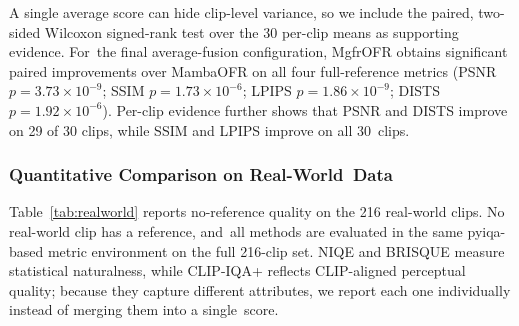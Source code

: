 \documentclass[symmetry,article,accept,pdftex,moreauthors]{Definitions/mdpi}
\begin{document}
A single average score can hide clip-level variance, so we include the paired, two-sided Wilcoxon signed-rank test over the 30 per-clip means as supporting evidence. For~the final average-fusion configuration, MgfrOFR obtains significant paired improvements over MambaOFR on all four full-reference metrics (PSNR $p=3.73\times10^{-9}$; SSIM $p=1.73\times10^{-6}$; LPIPS $p=1.86\times10^{-9}$; DISTS $p=1.92\times10^{-6}$). Per-clip evidence further shows that PSNR and DISTS improve on 29 of 30 clips, while SSIM and LPIPS improve on all 30~clips.

\subsubsection{Quantitative Comparison on Real-World~Data}

Table~\ref{tab:realworld} reports no-reference quality on the 216 real-world clips. No real-world clip has a reference, and~all methods are evaluated in the same pyiqa-based metric environment on the full 216-clip set. NIQE and BRISQUE measure statistical naturalness, while CLIP-IQA+ reflects CLIP-aligned perceptual quality; because they capture different attributes, we report each one individually instead of merging them into a single~score.
\end{document}

